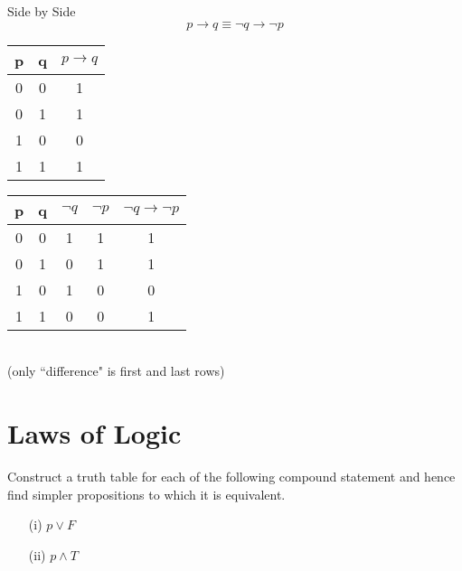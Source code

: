 \documentclass[12pt]{article}
\begin{document}
Side by Side
\[ p \rightarrow q \equiv \neg q \rightarrow \neg p\]
\bigskip
{ 
\hspace{0.5cm} \begin{tabular}{|c|c||c|}
\hline  p&  q& $p \rightarrow q$ \\ 
\hline  0&  0&  1\\ 
\hline  0&  1&  1\\ 
\hline  1&  0&  0\\ 
\hline  1&  1&  1\\ 
\hline 
\end{tabular} \hspace{0.5cm} \begin{tabular}{|c|c||c|c|c|}
\hline  p&  q& $\neg q$ & $\neg p$ & $\neg q \rightarrow \neg p$ \\ 
\hline  0&  0& 1& 1& 1\\ 
\hline  0&  1& 0& 1& 1\\ 
\hline  1&  0& 1& 0& 0\\ 
\hline  1&  1& 0& 0& 1\\ 
\hline 
\end{tabular}
}\\
(only ``difference" is first and last rows)






\section{Laws of Logic}

Construct a truth table for each of the following compound statement and hence find simpler propositions to which it is equivalent.


\begin{itemize}
\item[(i)] $p \vee F$
\item[(ii)] $p \wedge T$
\end{itemize}
\end{document}
